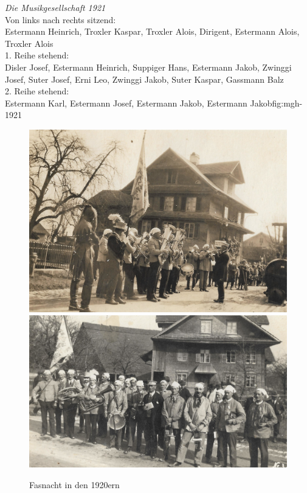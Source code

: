 \documentclass[]{book}
\begin{document}
{ \emph{Die Musikgesellschaft 1921}\\
    Von links nach rechts sitzend:\\
    Estermann Heinrich, Troxler Kaspar, Troxler Alois, Dirigent, Estermann Alois,
    Troxler Alois\\
    1. Reihe stehend:\\
    Disler Josef, Estermann Heinrich, Suppiger Hans, Estermann Jakob, Zwinggi
    Josef, Suter Josef, Erni Leo, Zwinggi Jakob, Suter Kaspar, Gassmann Balz\\
    2. Reihe stehend:\\
    Estermann Karl, Estermann Josef, Estermann Jakob, Estermann
    Jakob}{fig:mgh-1921}


\begin{figure}[!ht]
    \centerline{
        \includegraphics{./chap/1900-1925/Fasnacht-1920er-1.jpg}
        \includegraphics{./chap/1900-1925/Fasnacht-1920er-2.jpg}}
    \label{fig:mgh-fasnacht-1920}
    \caption{Fasnacht in den 1920ern}
\end{figure}
\clearpage
\end{document}
